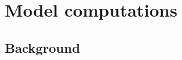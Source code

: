 \documentclass{aa-note}    %
\makeatletter
\newcommand{\bibnote}[2]{\global\@namedef{#1note}{#2}}
\def\linkadspage#1#2#3{\href{http://adsabs.harvard.edu/cgi-bin/nph-data_query?bibcode=#1\&link_type=ARTICLE\&db_key=AST\#page=#2}{#3}}
\def\HI{\ion{H}{I}}            %
\def\MgI{\ion{Mg}{I}}          %
\makeatother
\begin{document}



\section{Model computations}    \label{sec:computations}

\subsection{Background}
\end{document}
